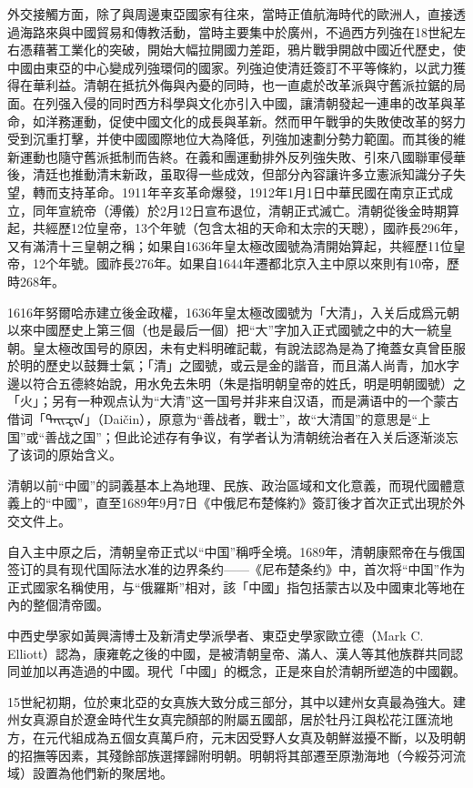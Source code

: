 外交接觸方面，除了與周邊東亞國家有往來，當時正值航海時代的歐洲人，直接透過海路來與中國貿易和傳教活動，當時主要集中於廣州，不過西方列強在18世紀左右憑藉著工業化的突破，開始大幅拉開國力差距，鴉片戰爭開啟中國近代歷史，使中國由東亞的中心變成列強環伺的國家。列強迫使清廷簽訂不平等條約，以武力獲得在華利益。清朝在抵抗外侮與內憂的同時，也一直處於改革派與守舊派拉鋸的局面。在列强入侵的同时西方科學與文化亦引入中國，讓清朝發起一連串的改革與革命，如洋務運動，促使中國文化的成長與革新。然而甲午戰爭的失敗使改革的努力受到沉重打擊，并使中國國際地位大為降低，列強加速劃分勢力範圍。而其後的維新運動也隨守舊派抵制而告終。在義和團運動排外反列強失敗、引來八國聯軍侵華後，清廷也推動清末新政，虽取得一些成效，但部分內容讓许多立憲派知識分子失望，轉而支持革命。1911年辛亥革命爆發，1912年1月1日中華民國在南京正式成立，同年宣統帝（溥儀）於2月12日宣布退位，清朝正式滅亡。清朝從後金時期算起，共經歷12位皇帝，13个年號（包含太祖的天命和太宗的天聰），國祚長296年，又有滿清十三皇朝之稱；如果自1636年皇太極改國號為清開始算起，共經歷11位皇帝，12个年號。國祚長276年。如果自1644年遷都北京入主中原以來則有10帝，歷時268年。

1616年努爾哈赤建立後金政權，1636年皇太極改國號为「大清」，入关后成爲元朝以來中國歷史上第三個（也是最后一個）把“大”字加入正式國號之中的大一統皇朝。皇太極改国号的原因，未有史料明確記載，有說法認為是為了掩蓋女真曾臣服於明的歷史以鼓舞士氣；「清」之國號，或云是金的諧音，而且滿人尚青，加水字邊以符合五德終始說，用水免去朱明（朱是指明朝皇帝的姓氏，明是明朝國號）之「火」；另有一种观点认为“大清”这一国号并非来自汉语，而是满语中的一个蒙古借词「ᠳᠠᠢᠼᠢᠨ」（Daičin），原意为“善战者，戰士”，故“大清国”的意思是“上国”或“善战之国”；但此论述存有争议，有学者认为清朝统治者在入关后逐渐淡忘了该词的原始含义。

清朝以前“中國”的詞義基本上為地理、民族、政治區域和文化意義，而現代國體意義上的“中國”，直至1689年9月7日《中俄尼布楚條約》簽訂後才首次正式出現於外交文件上。

自入主中原之后，清朝皇帝正式以“中国”稱呼全境。1689年，清朝康熙帝在与俄国签订的具有现代国际法水准的边界条约——《尼布楚条约》中，首次将“中国”作为正式國家名稱使用，与“俄羅斯”相对，該「中國」指包括蒙古以及中國東北等地在內的整個清帝國。

中西史學家如黃興濤博士及新清史學派學者、東亞史學家歐立德（Mark C. Elliott）認為，康雍乾之後的中國，是被清朝皇帝、滿人、漢人等其他族群共同認同並加以再造過的中國。現代「中國」的概念，正是來自於清朝所塑造的中國觀。

15世紀初期，位於東北亞的女真族大致分成三部分，其中以建州女真最為強大。建州女真源自於遼金時代生女真完顏部的附屬五國部，居於牡丹江與松花江匯流地方，在元代組成為五個女真萬戶府，元末因受野人女真及朝鮮滋擾不斷，以及明朝的招撫等因素，其殘餘部族選擇歸附明朝。明朝将其部遷至原渤海地（今綏芬河流域）設置為他們新的聚居地。

